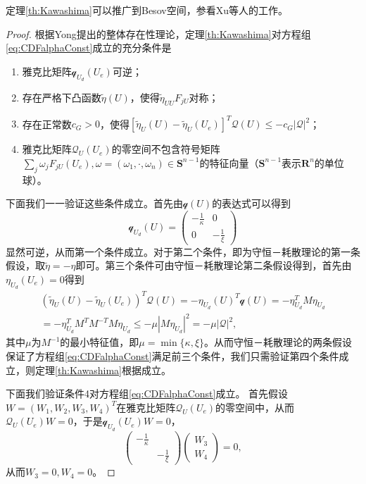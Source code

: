 	\begin{remark}
	定理\ref{th:Kawashima}可以推广到Besov空间，参看Xu等人的工作\cite{xu2014global,xu2014optimal}。
	\end{remark}

	\begin{proof}
		根据Yong提出的整体存在性理论\cite{yong2004entropy}，定理\ref{th:Kawashima}对方程组\eqref{eq:CDFalphaConst}成立的充分条件是
		\begin{enumerate}
			\item 雅克比矩阵$\mathcal{q}_{U_d}(U_e)$可逆；
			\item 存在严格下凸函数$\tilde{\eta}(U)$，使得$\tilde{\eta}_{UU}F_{jU}$对称；
			\item 存在正常数$c_G >0$，使得$[\tilde{\eta}_{U}(U) - \tilde{\eta}_{U}(U_e)]^T \mathcal{Q}(U) \le - c_G |\mathcal{Q}|^2$；
			\item 雅克比矩阵$\mathcal{Q}_U(U_e)$的零空间不包含符号矩阵$\sum_{j} \omega_j F_{jU}(U_e), \omega =(\omega_1, \cdot,\omega_n) \in \mathbf{S}^{n-1}$的特征向量（$\mathbf{S}^{n-1}$表示$\mathbf{R}^n$的单位球）。
		\end{enumerate}

		下面我们一一验证这些条件成立。首先由$\mathcal{q}(U)$的表达式可以得到
		\begin{equation*}
			\mathcal{q}_{U_d}(U) = \left( \begin{array}{cc} 
				-\frac{1}{\kappa} & 0 \\
				0 & -\frac{1}{\xi}
			\end{array}\right)
		\end{equation*}
		显然可逆，从而第一个条件成立。对于第二个条件，即为守恒－耗散理论的第一条假设，取$\tilde{\eta} = -\eta$即可。第三个条件可由守恒－耗散理论第二条假设得到，首先由$\eta_{U_d}(U_e) = 0$得到
		\begin{eqnarray*}
			(\tilde{\eta}_{U}(U) - \tilde{\eta}_{U}(U_e))^T \mathcal{Q}(U) = -\eta_{U_d}(U)^T  \mathcal{q}(U) = -\eta_{U_d}^T M \eta_{U_d} \\
			= -\eta_{U_d}^T M^T M^{-T} M \eta_{U_d} \le -\mu |M\eta_{U_d}|^2 = - \mu |\mathcal{Q}|^2 ,
		\end{eqnarray*}
	其中$\mu$为$M^{-1}$的最小特征值，即$\mu= \min\{\kappa, \xi\}$。从而守恒－耗散理论的两条假设保证了方程组\eqref{eq:CDFalphaConst}满足前三个条件，我们只需验证第四个条件成立，则定理\eqref{th:Kawashima}根据\cite{yong2004entropy}成立。

	下面我们验证条件4对方程组\eqref{eq:CDFalphaConst}成立。
	首先假设$W = (W_1,W_2,W_3,W_4)^T$在雅克比矩阵$\mathcal{Q}_U(U_e)$的零空间中，从而$\mathcal{Q}_U(U_e) W = 0$，于是$\mathcal{q}_{U_d}(U_e) W=0$，
	\begin{equation*}
		\left( \begin{array}{cc} 
		-\frac{1}{\kappa} & \\
		&　-\frac{1}{\xi} 
		\end{array} \right) 
		\left( \begin{array}{c} W_3 \\W_4 \end{array} \right) = 0,
	\end{equation*}
	从而$W_3=0,W_4=0$。


\end{proof}
